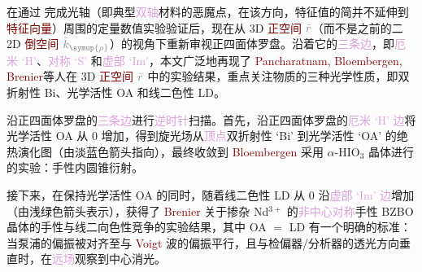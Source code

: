 在通过  完成\textcolor{PineGreen}{光轴}（即典型\textcolor{Plum}{双轴}材料的\textcolor{PineGreen}{恶魔点}，在该方向，\textcolor{PineGreen}{特征值}的简并不延伸到\textcolor{Maroon}{特征向量}）周围的定量数值实验验证后，现在从 3D \textcolor{Maroon}{正空间} $\mathcolor{gray}{\bar{r}}$（而不是之前的二 2D \textcolor{Maroon}{倒空间} $\mathcolor{gray}{\bar{k}_{\symup{\rho}}}$）的视角下重新审视\textcolor{NavyBlue}{正四面体罗盘}。沿着它的\textcolor{Plum}{三条边}，即\textcolor{Plum}{厄米 `H'}、\textcolor{Plum}{对称 `S'} 和\textcolor{Plum}{虚部 `Im'}，本文广泛地再现了 \textcolor{Maroon}{Pancharatnam}\cite{pancharatnamPropagationLightAbsorbing1955}, \textcolor{Maroon}{Bloembergen}\cite{schellLaserStudiesInternal1978b}, \textcolor{Maroon}{Brenier}\cite{brenierVoigtWaveInvestigation2015,brenierLasingConicalDiffraction2016,brenierChiralityDichroismCompetition2017}等人\cite{ballantineConicalDiffractionDispersion2014,zhangNonparaxialIdealizedPolarizer2018,berryOrbitalSpinAngular2005,tangHarmonicSpinOrbit2020,schellLaserStudiesInternal1978b,pancharatnamPropagationLightAbsorbing1955,brenierVoigtWaveInvestigation2015,brenierLasingConicalDiffraction2016,brenierChiralityDichroismCompetition2017}在 3D \textcolor{Maroon}{正空间} $\mathcolor{gray}{\bar{r}}$ 中的实验结果，重点关注物质的三种光学性质，即\textcolor{NavyBlue}{双折射性 Bi}、\textcolor{NavyBlue}{光学活性 OA} 和\textcolor{NavyBlue}{线二色性 LD}。

沿\textcolor{NavyBlue}{正四面体罗盘}的\textcolor{Plum}{三条边}进行\textcolor{Plum}{逆时针}扫描。首先，沿\textcolor{NavyBlue}{正四面体罗盘}的\textcolor{Plum}{厄米 `H' 边}将\textcolor{NavyBlue}{光学活性 OA} 从 0 增加，得到旋光场从\textcolor{Plum}{顶点}\textcolor{NavyBlue}{双折射性 `Bi'} 到\textcolor{NavyBlue}{光学活性 `OA'} 的\textcolor{NavyBlue}{绝热演化}图（由淡蓝色箭头指向），最终收敛到 \textcolor{Maroon}{Bloembergen} 采用 $\alpha$-HIO$_3$ 晶体进行的实验：\textcolor{NavyBlue}{手性}\textcolor{PineGreen}{内圆锥衍射}\cite{schellLaserStudiesInternal1978b}。

接下来，在保持\textcolor{NavyBlue}{光学活性 OA} 的同时，随着\textcolor{NavyBlue}{线二色性 LD} 从 0 沿\textcolor{Plum}{虚部 `Im' 边}增加（由浅绿色箭头表示），获得了 \textcolor{Maroon}{Brenier} 关于掺杂 Nd$^{3+}$ 的\textcolor{Plum}{非中心对称}\textcolor{NavyBlue}{手性} BZBO 晶体的\textcolor{NavyBlue}{手性}与\textcolor{NavyBlue}{线二向色性}竞争的实验结果，其中 \textcolor{NavyBlue}{OA} $=$ \textcolor{NavyBlue}{LD} 有一个明确的标准：当\textcolor{NavyBlue}{泵浦}的偏振被对齐至与 \textcolor{Maroon}{Voigt} 波的偏振平行，且与\textcolor{PineGreen}{检偏器}/\textcolor{PineGreen}{分析器}的透光方向垂直时，在\textcolor{Plum}{远场}观察到\textcolor{PineGreen}{中心消光}。

